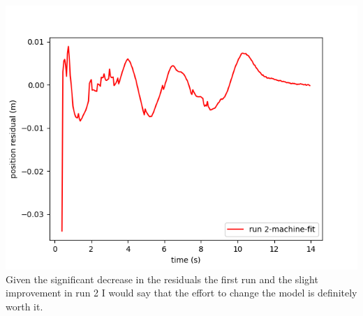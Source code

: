 \documentclass[10pt]{article}
\theoremstyle{definition}
\begin{document}
\includegraphics{Figure_11-R2RN.png}\\

Given the significant decrease in the residuals the first run and the slight improvement in run 2 I would say that the effort to change the model is definitely worth it.
\end{document}
